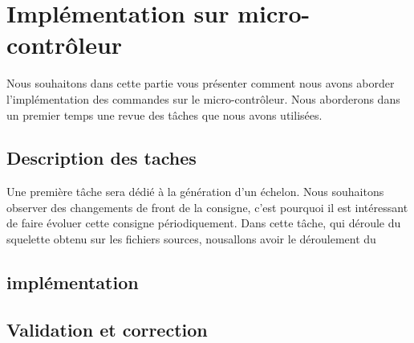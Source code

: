 \section{Implémentation sur micro-contrôleur}	
Nous souhaitons dans cette partie vous présenter comment nous avons aborder l'implémentation des commandes sur le micro-contrôleur. Nous aborderons dans un premier temps une revue des tâches que nous avons utilisées. 
		\subsection{Description des taches}
		Une première tâche sera dédié à la génération d'un échelon. Nous souhaitons observer des changements de front de la consigne, c'est pourquoi il est intéressant de faire évoluer cette consigne périodiquement. Dans cette tâche, qui déroule du squelette obtenu sur les fichiers sources, nousallons avoir le déroulement du 
		 
		
		\subsection{implémentation}
		\subsection{Validation et correction}